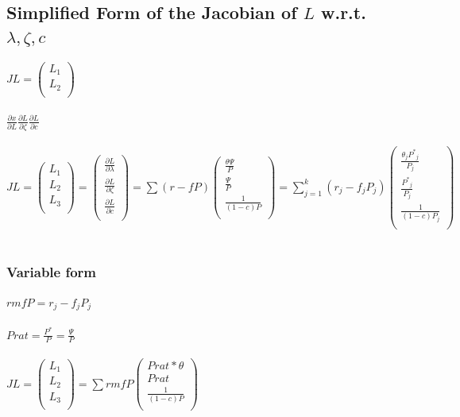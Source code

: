 \documentclass{article}
\begin{document}
\subsection{Simplified Form of the Jacobian of $L$ w.r.t. $\lambda,\zeta,c$}

$JL=( \begin{array}{c}
L_1 \\
L_2 \\
\end{array} )$
\\\\
$\frac{\partial x}{\partial L} \frac{\partial L}{\partial \zeta } \frac{\partial L}{\partial c}$
\\\\
$JL=( \begin{array}{c}
L_1 \\
L_2 \\
L_3 \\
\end{array} )=( \begin{array}{c}
  \frac{\partial L}{\partial \lambda } \\
\frac{\partial L}{\partial \zeta } \\
\frac{\partial L}{\partial c} \\
\end{array} )=\sum (r-f P) ( \begin{array}{c}
  \frac{\theta \Psi }{P} \\
\frac{\Psi }{P} \\
\frac{1}{(1-c) P} \\
\end{array} ) =
\sum _{j=1}^k (r_j-f_j P_j) ( \begin{array}{c}
  \frac{\theta _j P^*{}_j}{P_j} \\
  \frac{P^*{}_j}{P_j} \\
  \frac{1}{(1-c) P_j} \\
\end{array} )$
\\\\
\subsubsection{Variable form}

$rmfP=r_j-f_j P_j$
\\\\
$Prat=\frac{P^*}{P}=\frac{\Psi }{P}$
\\\\
$JL=( \begin{array}{c}
  L_1 \\
  L_2 \\
  L_3 \\
\end{array} ) =
\sum rmfP ( \begin{array}{c}
  Prat * \theta \\
  Prat \\
  \frac{1}{(1-c) P} \\
\end{array} )$
\\\\
\end{document}
